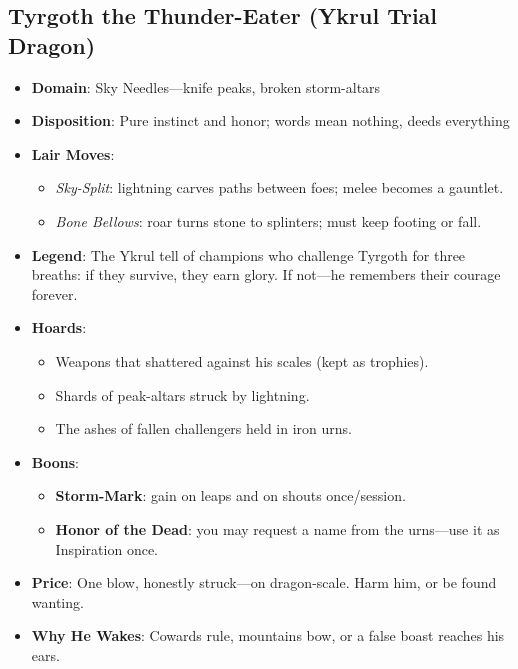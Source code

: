 \documentclass[11pt,letterpaper]{article}
\begin{document}
\subsection{Tyrgoth the Thunder-Eater (Ykrul Trial Dragon)}
\begin{itemize}
\item \textbf{Domain}: Sky Needles---knife peaks, broken storm-altars
\item \textbf{Disposition}: Pure instinct and honor; words mean nothing, deeds everything
\item \textbf{Lair Moves}:
  \begin{itemize}
  \item \emph{Sky-Split}: lightning carves paths between foes; melee becomes a gauntlet.
  \item \emph{Bone Bellows}: roar turns stone to splinters; must keep footing or fall.
  \end{itemize}
\item \textbf{Legend}: The Ykrul tell of champions who challenge Tyrgoth for three breaths: if they survive, they earn glory. If not---he remembers their courage forever.
\item \textbf{Hoards}:
  \begin{itemize}
  \item Weapons that shattered against his scales (kept as trophies).
  \item Shards of peak-altars struck by lightning.
  \item The ashes of fallen challengers held in iron urns.
  \end{itemize}
\item \textbf{Boons}:
  \begin{itemize}
  \item \textbf{Storm-Mark}: gain  on leaps and  on shouts once/session.
  \item \textbf{Honor of the Dead}: you may request a name from the urns---use it as Inspiration once.
  \end{itemize}
\item \textbf{Price}: One blow, honestly struck---on dragon-scale. Harm him, or be found wanting.
\item \textbf{Why He Wakes}: Cowards rule, mountains bow, or a false boast reaches his ears.
\end{itemize}

\end{document}
